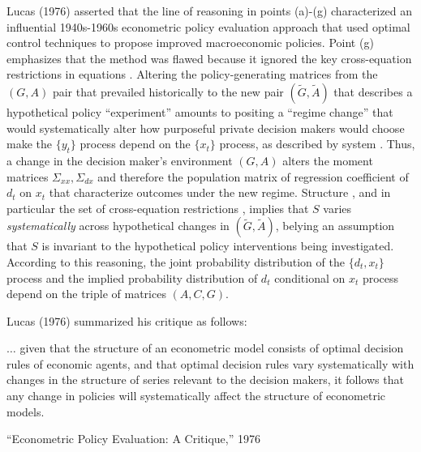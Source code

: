\medskip

Lucas (1976) asserted  that the  line of reasoning in points (a)-(g)    characterized an influential  1940s-1960s econometric policy evaluation
approach  that used  optimal control techniques  to propose  improved  macroeconomic policies. 
Point (g) emphasizes  that the method was flawed because it  ignored
 the key cross-equation restrictions in equations . Altering the policy-generating
matrices from the $(G, A)$ pair that prevailed historically to the new pair  $(\tilde G, \tilde A)$ that describes a  hypothetical policy ``experiment'' 
  amounts to   positing a  ``regime change'' that
 would   systematically  alter how purposeful  private decision makers would choose  make the  $\{y_t\}$ process depend on the  $\{x_t\}$ process, as
 described by
 system .  %
 Thus, a 
 change in the decision maker's  environment $(G, A)$   alters the moment matrices
$ \Sigma_{xx}, \Sigma_{dx}$ and therefore the population  matrix of regression coefficient of  $d_t$ on $x_t$ that characterize outcomes
under the new  regime. Structure , and in particular the set of cross-equation restrictions ,
implies  that $S$  varies {\it systematically\/} across   hypothetical changes
in  $(\tilde G, \tilde A)$, belying an  assumption that $S$ is invariant to the hypothetical policy interventions being investigated.
According to this reasoning, the joint probability distribution of the $\{d_t, x_t\}$ process and the implied
  probability distribution
of $d_t$ conditional on  $x_t$ process  depend on the  triple of matrices $(A, C, G)$.

Lucas (1976) summarized his critique  as follows:

\epigraph{$\ldots$ given that the structure of an econometric model consists of optimal decision rules of economic agents, and
that optimal decision rules vary systematically with changes in the structure of series relevant to the decision makers, it follows
that any change in policies will systematically affect the structure of econometric models.}{``Econometric Policy Evaluation: A Critique,'' 1976}



